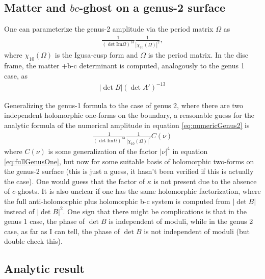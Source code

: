 \documentclass[12pt]{article}
\newcommand{\im}{\mathrm{Im}}
\begin{document}
\subsection{Matter and $bc$-ghost on a genus-2 surface}
One can parameterize the genus-2 amplitude via the period matrix $\Omega$ as
\begin{align}
\frac{1}{(\det \im \Omega)^{13}}\frac{1}{|\chi_{10}(\Omega)|^2},
\end{align}
where $\chi_{10}(\Omega)$ is the Igusa-cusp form and $\Omega$ is the period matrix. In the disc frame, the matter +b-c determinant is computed, analogously to the genus 1 case, as 
\begin{align}
\label{eq:numericGenus2}
|\det B| (\det A')^{-13}
\end{align}

Generalizing the genus-1 formula to the case of genus 2, where there are two independent holomorphic one-forms on the boundary, a reasonable guess for the analytic formula of the numerical amplitude in equation \ref{eq:numericGenus2} is
\begin{align}
\frac{1}{(\det \im \Omega)^{13}}\frac{1}{|\chi_{10}(\Omega)|^2}C(\nu)
\end{align}
where $C(\nu)$ is some generalization of the factor $|\nu|^4$ in equation \ref{eq:fullGenusOne}, but now for some suitable basis of holomorphic two-forms on the genus-2 surface (this is just a guess, it hasn't been verified if this is actually the case). One would guess that the factor of $\kappa$ is not present due to the absence of $c$-ghosts. It is also unclear if one has the same holomorphic factorization, where the full anti-holomorphic plus holomorphic b-c system is computed from $|\det B|$ instead of $|\det B|^2$. One sign that there might be complications is that in the genus 1 case, the phase of $\det B$ is independent of moduli, while in the genus 2 case, as far as I can tell, the phase of $\det B$ is not independent of moduli (but double check this).

\subsection{Analytic result}
\end{document}
